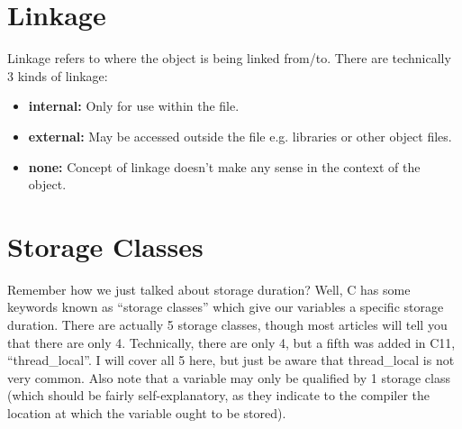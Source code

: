 \documentclass{article}
\begin{document}
\section{Linkage}

Linkage refers to where the object is being linked from/to. There are technically 3 kinds of linkage:

\begin{itemize}

\item{%
    \textbf{internal:} Only for use within the file.
}

\item{%
    \textbf{external:} May be accessed outside the file e.g. libraries or other object files.
}

\item{%
    \textbf{none:} Concept of linkage doesn't make any sense in the context of the object.
}

\end{itemize}

\section{Storage Classes}

Remember how we just talked about storage duration? Well, C has some keywords known as “storage classes”
which give our variables a specific storage duration. There are actually 5 storage classes, though most
articles will tell you that there are only 4. Technically, there are only 4, but a fifth was added in C11,
“thread_local”. I will cover all 5 here, but just be aware that thread_local is not very common. Also note
that a variable may only be qualified by 1 storage class (which should be fairly self-explanatory, as they
indicate to the compiler the location at which the variable ought to be stored).
\end{document}
